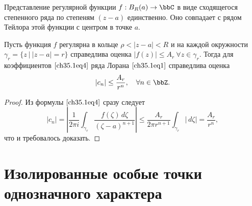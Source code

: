 \begin{cons}
Представление регулярной функции $f : B_R(a) \to \bbC$ в виде сходящегося степенного ряда по степеням $(z - a)$ единственно. Оно совпадает с рядом Тейлора этой функции с центром в точке $a$.
\end{cons}

\begin{cons}  \label{ch35.1cons3}
Пусть функция $f$ регулярна в кольце $\rho < |z - a| < R$ и на каждой окружности $\gamma_r = \{ z \: \big| \: |z - a| = r\}$ справедлива оценка $|f(z)| \le A_r \: \forall z \in \gamma_r$. Тогда для коэффициентов $\eqref{ch35.1eq4}$ ряда Лорана $\eqref{ch35.1eq1}$ справедлива оценка
\begin{equation} \label{ch35.1eq20}
|c_n| \le \frac{A_r}{r^n}, \quad \forall n \in \bbZ.
\end{equation}

\begin{proof}
Из формулы $\eqref{ch35.1eq4}$ сразу следует
$$
|c_n| = \left| \frac{1}{2\pi i} \int_{\gamma_r} \frac{f(\zeta)\,d\zeta}{(\zeta - a)^{n + 1}} \right| \le \frac{A_r}{2\pi r^{n + 1}} \int_{\gamma_r} |\,d\zeta| = \frac{A_r}{r^n},
$$
что и требовалось доказать.
\end{proof}
\end{cons}

\section{Изолированные особые точки однозначного характера}

